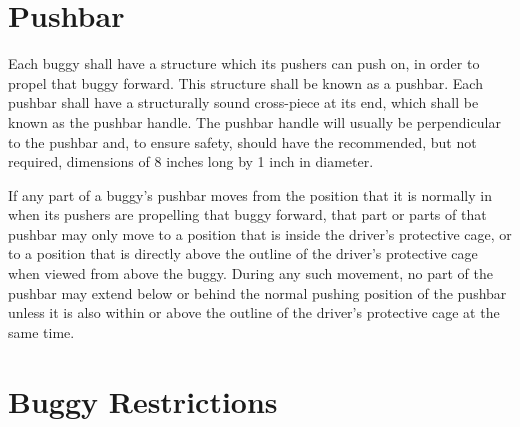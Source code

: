 \section{Pushbar}

	Each buggy shall have a structure which its pushers can push on, in order to
	propel that buggy forward. This structure shall be known as a pushbar. Each
	pushbar shall have a structurally sound cross-piece at its end, which shall be
	known as the pushbar handle. The pushbar handle will usually be perpendicular
	to the pushbar and, to ensure safety, should have the recommended, but not
	required, dimensions of 8 inches long by 1 inch in diameter.

	If any part of a buggy's pushbar moves from the position that it is normally in
	when its pushers are propelling that buggy forward, that part or parts of that
	pushbar may only move to a position that is inside the driver's protective
	cage, or to a position that is directly above the outline of the driver's
	protective cage when viewed from above the buggy. During any such movement, no
	part of the pushbar may extend below or behind the normal pushing position of
	the pushbar unless it is also within or above the outline of the driver's
	protective cage at the same time.

\section{Buggy Restrictions}

